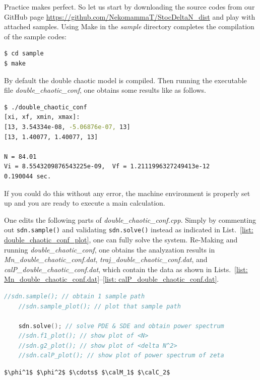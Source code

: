\documentclass[aps, prd
, preprint
, nofootinbib 
, notitlepage
, superscriptaddress
, longbibliography
]{revtex4-1}
\newcommand{\calC}{\mathcal{C}}
\newcommand{\calM}{\mathcal{M}}
\newcommand{\calN}{\mathcal{N}}
\begin{document}
Practice makes perfect. 
So let us start by downloading the source codes from our GitHub page \url{https://github.com/NekomammaT/StocDeltaN_dist} and play with attached samples.
Using Make in the \textit{sample} directory completes the compilation of the sample codes:
\begin{lstlisting}[language = bash, numbers = none]
$ cd sample
$ make
\end{lstlisting}
By default the double chaotic model is compiled. Then running the executable file \textit{double\_chaotic\_conf}, one obtains some results like as follows.
\begin{lstlisting}[language = bash, numbers = none]
$ ./double_chaotic_conf
[xi, xf, xmin, xmax]:
[13, 3.54334e-08, -5.06876e-07, 13]
[13, 1.40077, 1.40077, 13]

N = 84.01
Vi = 8.5543209876543225e-09,  Vf = 1.2111996327249413e-12
0.190044 sec.
\end{lstlisting}
If you could do this without any error, the machine environment is properly set up and you are ready to execute a main calculation.

One edits the following parts of \textit{double\_chaotic\_conf.cpp}. Simply by commenting out \texttt{sdn.sample()} and validating \texttt{sdn.solve()} instead as 
indicated in List.~\ref{list: double_chaotic_conf_plot},
one can fully solve the system.
Re-Making and running \textit{double\_chaotic\_conf}, one obtains the analyzation results in 
\textit{Mn\_double\_chaotic\_conf.dat}, \textit{traj\_double\_chaotic\_conf.dat},
and \textit{calP\_double\_chaotic\_conf.dat}, which contain the data as shown in Lists.~\ref{list: Mn_double_chaotic_conf.dat}--\ref{list: calP_double_chaotic_conf.dat}.

\begin{lstlisting}[language = C++, caption=\textit{sample/double\_chaotic\_conf.cpp}, label = list: double_chaotic_conf_plot, firstnumber = 77]
	//sdn.sample(); // obtain 1 sample path
	//sdn.sample_plot(); // plot that sample path 
	
	sdn.solve(); // solve PDE & SDE and obtain power spectrum  
	//sdn.f1_plot(); // show plot of <N>
	//sdn.g2_plot(); // show plot of <delta N^2> 
	//sdn.calP_plot(); // show plot of power spectrum of zeta
\end{lstlisting}

\vfill

\begin{lstlisting}[numbers = none, mathescape, caption={\textit{Mn\_}$\braket{\text{model name}}$\textit{.dat} : 
contour data of $\calM_n=\braket{\calN^n}$ and $\calC_2=\braket{\delta\calN^2}$}, label = list: Mn_double_chaotic_conf.dat]
$\phi^1$ $\phi^2$ $\cdots$ $\calM_1$ $\calC_2$
\end{lstlisting}
\end{document}
